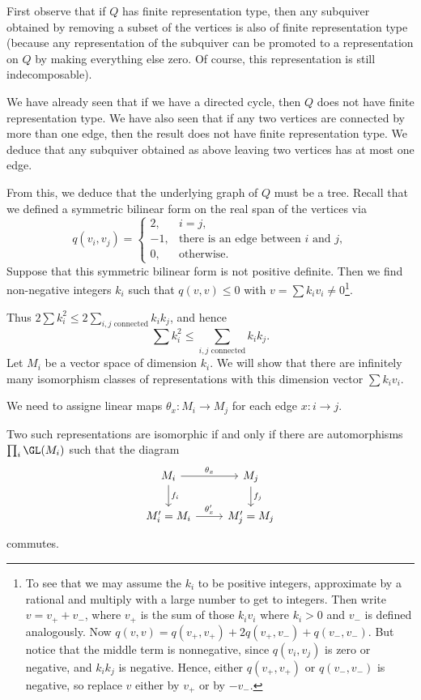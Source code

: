 First observe that if $Q$ has finite representation type, then any subquiver
obtained by removing a subset of the vertices is also of finite representation
type (because any representation of the subquiver can be promoted to a representation
on $Q$ by making everything else zero. Of course, this representation is still
indecomposable).

We have already seen that if we have a directed cycle, then $Q$ does not have
finite representation type. We have also seen that if any two vertices are
connected by more than one edge, then the result does not have finite
representation type. We deduce that any subquiver obtained as above leaving
two vertices has at most one edge.

From this, we deduce that the underlying graph of $Q$ must be a tree.
Recall that we
defined a symmetric bilinear form on the real span of the vertices via
\[ q(v_i, v_j) =
\begin{cases}
	2, & i = j,\\
	-1, & \text{there is an edge between $i$ and $j$},\\
	0, & \text{otherwise}.
\end{cases}\]
Suppose that this symmetric bilinear form is not positive definite. Then
we find non-negative integers $k_i$ such that $q(v, v)\leq 0$ with
$v = \sum k_iv_i \neq 0$\footnote{To see that we may assume the $k_i$ to be positive
integers, approximate by a rational and multiply with a large number to get
to integers. Then write $v = v_+ + v_-$, where  $v_+$ is the sum of those
$k_iv_i$ where $k_i > 0$ and $v_-$ is defined analogously. Now
$q(v, v) = q(v_+, v_+) + 2q(v_+, v_-) + q(v_-, v_-)$. But notice that the middle
term is nonnegative, since $q(v_i, v_j)$ is zero or negative, and $k_ik_j$ is
negative. Hence, either $q(v_+, v_+)$ or $q(v_-, v_-)$ is negative, so replace
$v$ either by $v_+$ or by $-v_-$.}.

Thus $2\sum k_i^2\leq 2\sum_{\text{$i, j$ connected}} k_ik_j$, and hence
\begin{equation}\tag{$\star$}
	\sum k_i^2 \leq \sum_{\text{$i, j$ connected}} k_ik_j.
\end{equation}
Let $M_i$ be a vector space of dimension $k_i$. We will show that there are
infinitely many isomorphism classes of representations with this dimension
vector $\sum k_iv_i$.

We need to assigne linear maps $\theta_x\colon M_i\to M_j$ for each edge
$x\colon i\to j$.

Two such representations are isomorphic if and only if there are automorphisms
$\prod_i \GL(M_i)$ such that the diagram
\[\begin{tikzcd}
	M_i\ar[r, "\theta_x"]\ar[d, "f_i"] & M_j\ar[d, "f_j"]\\
	M_i'\ar[r, "\theta_x'"] = M_i & M_j' = M_j
\end{tikzcd}\]
commutes.

